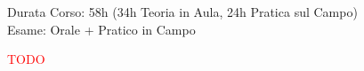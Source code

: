 \documentclass[../uefaC.tex]{subfiles}
\begin{document}

Durata Corso: 58h (34h Teoria in Aula, 24h Pratica sul Campo) \hfill \\
Esame: Orale + Pratico in Campo

\textcolor{red}{TODO}
\end{document}
